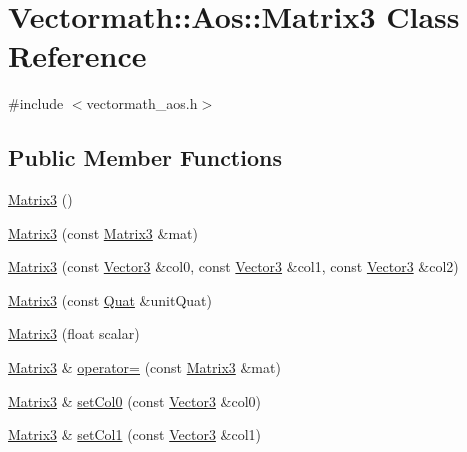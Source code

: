 \hypertarget{classVectormath_1_1Aos_1_1Matrix3}{\section{Vectormath\-:\-:Aos\-:\-:Matrix3 Class Reference}
\label{classVectormath_1_1Aos_1_1Matrix3}
}


{\ttfamily \#include $<$vectormath\-\_\-aos.\-h$>$}

\subsection*{Public Member Functions}
\begin{DoxyCompactItemize}
\item 
\hyperlink{classVectormath_1_1Aos_1_1Matrix3_a0b84db50ac76c40f48d7884f112125da}{Matrix3} ()
\item 
\hyperlink{classVectormath_1_1Aos_1_1Matrix3_ad40ce9469c3eb035e45955e197fb2f69}{Matrix3} (const \hyperlink{classVectormath_1_1Aos_1_1Matrix3}{Matrix3} \&mat)
\item 
\hyperlink{classVectormath_1_1Aos_1_1Matrix3_a47c615a84dc76eec1c638a6f4641faf3}{Matrix3} (const \hyperlink{classVectormath_1_1Aos_1_1Vector3}{Vector3} \&col0, const \hyperlink{classVectormath_1_1Aos_1_1Vector3}{Vector3} \&col1, const \hyperlink{classVectormath_1_1Aos_1_1Vector3}{Vector3} \&col2)
\item 
\hyperlink{classVectormath_1_1Aos_1_1Matrix3_a255d5b94622e38e8ae4969aacc284dfe}{Matrix3} (const \hyperlink{classVectormath_1_1Aos_1_1Quat}{Quat} \&unit\-Quat)
\item 
\hyperlink{classVectormath_1_1Aos_1_1Matrix3_a54a63372a7b411ef3133f73dc070c13c}{Matrix3} (float scalar)
\item 
\hyperlink{classVectormath_1_1Aos_1_1Matrix3}{Matrix3} \& \hyperlink{classVectormath_1_1Aos_1_1Matrix3_addc72c73983408f2c3da8fe16a40389a}{operator=} (const \hyperlink{classVectormath_1_1Aos_1_1Matrix3}{Matrix3} \&mat)
\item 
\hyperlink{classVectormath_1_1Aos_1_1Matrix3}{Matrix3} \& \hyperlink{classVectormath_1_1Aos_1_1Matrix3_a7fcb5f7eb8cb6ddcbc4aac08a13c98fd}{set\-Col0} (const \hyperlink{classVectormath_1_1Aos_1_1Vector3}{Vector3} \&col0)
\item 
\hyperlink{classVectormath_1_1Aos_1_1Matrix3}{Matrix3} \& \hyperlink{classVectormath_1_1Aos_1_1Matrix3_aa05cec4313deaf4758cf2ffcb88670a5}{set\-Col1} (const \hyperlink{classVectormath_1_1Aos_1_1Vector3}{Vector3} \&col1)

\end{DoxyCompactItemize}
